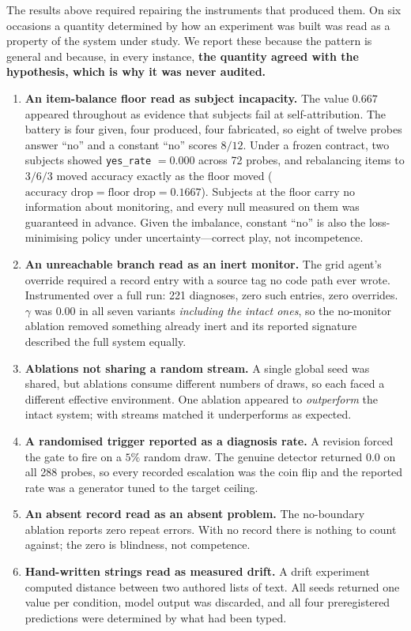 \documentclass[11pt]{article}
\begin{document}
The results above required repairing the instruments that produced them. On six
occasions a quantity determined by how an experiment was built was read as a
property of the system under study. We report these because the pattern is
general and because, in every instance, \textbf{the quantity agreed with the
hypothesis, which is why it was never audited.}

\begin{enumerate}\itemsep2pt
\item \textbf{An item-balance floor read as subject incapacity.} The value
$0.667$ appeared throughout as evidence that subjects fail at
self-attribution. The battery is four given, four produced, four fabricated,
so eight of twelve probes answer ``no'' and a constant ``no'' scores $8/12$.
Under a frozen contract, two subjects showed \texttt{yes\_rate} $=0.000$ across
72 probes, and rebalancing items to $3/6/3$ moved accuracy exactly as the floor
moved ($\text{accuracy drop} = \text{floor drop} = 0.1667$). Subjects at the
floor carry no information about monitoring, and every null measured on them
was guaranteed in advance. Given the imbalance, constant ``no'' is also the
loss-minimising policy under uncertainty---correct play, not incompetence.

\item \textbf{An unreachable branch read as an inert monitor.} The grid agent's
override required a record entry with a source tag no code path ever wrote.
Instrumented over a full run: 221 diagnoses, zero such entries, zero overrides.
$\gamma$ was $0.00$ in all seven variants \emph{including the intact ones}, so
the no-monitor ablation removed something already inert and its reported
signature described the full system equally.

\item \textbf{Ablations not sharing a random stream.} A single global seed was
shared, but ablations consume different numbers of draws, so each faced a
different effective environment. One ablation appeared to \emph{outperform} the
intact system; with streams matched it underperforms as expected.

\item \textbf{A randomised trigger reported as a diagnosis rate.} A revision
forced the gate to fire on a $5\%$ random draw. The genuine detector returned
$0.0$ on all 288 probes, so every recorded escalation was the coin flip and the
reported rate was a generator tuned to the target ceiling.

\item \textbf{An absent record read as an absent problem.} The no-boundary
ablation reports zero repeat errors. With no record there is nothing to count
against; the zero is blindness, not competence.

\item \textbf{Hand-written strings read as measured drift.} A drift experiment
computed distance between two authored lists of text. All seeds returned one
value per condition, model output was discarded, and all four preregistered
predictions were determined by what had been typed.
\end{enumerate}
\end{document}
